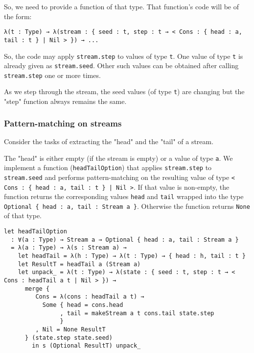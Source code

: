So, we need to provide a function of that type.
That function's code will be of the form:


\begin{lstlisting}[language=Dhall]
λ(t : Type) → λ(stream : { seed : t, step : t → < Cons : { head : a, tail : t } | Nil > }) → ...
\end{lstlisting}


So, the code may apply \lstinline!stream.step! to values of type \lstinline!t!.
One value of type \lstinline!t! is already given as \lstinline!stream.seed!.
Other such values can be obtained after calling \lstinline!stream.step! one or more times.


As we step through the stream, the seed values (of type \lstinline!t!) are changing but the "step" function always remains the same.


\subsubsection{Pattern-matching on streams}


Consider the tasks of extracting the "head" and the "tail" of a stream.


The "head" is either empty (if the stream is empty) or a value of type \lstinline!a!.
We implement a function (\lstinline!headTailOption!) that applies \lstinline!stream.step! to \lstinline!stream.seed! and performs pattern-matching on the resulting value of type \lstinline!< Cons : { head : a, tail : t } | Nil >!.
If that value is non-empty, the function returns the corresponding values \lstinline!head! and \lstinline!tail! wrapped into the type \lstinline!Optional { head : a, tail : Stream a }!.
Otherwise the function returns \lstinline!None! of that type.


\begin{lstlisting}[language=Dhall]
let headTailOption
  : ∀(a : Type) → Stream a → Optional { head : a, tail : Stream a }
  = λ(a : Type) → λ(s : Stream a) →
    let headTail = λ(h : Type) → λ(t : Type) → { head : h, tail : t }
    let ResultT = headTail a (Stream a)
    let unpack_ = λ(t : Type) → λ(state : { seed : t, step : t → < Cons : headTail a t | Nil > }) → 
      merge {
         Cons = λ(cons : headTail a t) →
           Some { head = cons.head
                , tail = makeStream a t cons.tail state.step
                }
         , Nil = None ResultT
      } (state.step state.seed)
        in s (Optional ResultT) unpack_
\end{lstlisting}


